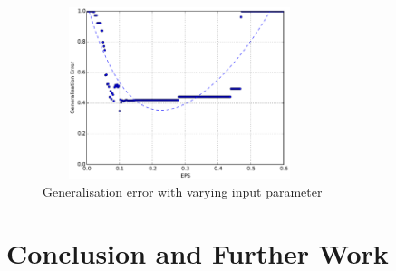 \documentclass{ecsarticle}     %
\begin{document}
\begin{figure}[ht]
   \centering
    \includegraphics[height = 5cm,width = 8cm]{error.pdf}
   \caption{Generalisation error with varying input parameter}
   \label{fig:error}
\end{figure}




\section{Conclusion and Further Work}



\end{document}
